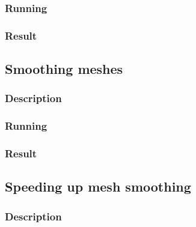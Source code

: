 \documentclass[paper=a4, fontsize=11pt]{scrartcl} %
\numberwithin{equation}{section} %
\numberwithin{figure}{section} %
\numberwithin{table}{section} %
\begin{document}
\subsubsection{Running}

\subsubsection{Result}


\subsection{Smoothing meshes}

\subsubsection{Description}

\subsubsection{Running}

\subsubsection{Result}

\subsection{Speeding up mesh smoothing}

\subsubsection{Description}
\end{document}
